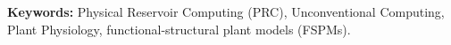 \vspace{.5cm}
\textbf{Keywords:} Physical Reservoir Computing (PRC), Unconventional Computing, Plant Physiology, functional-structural plant models (FSPMs).



